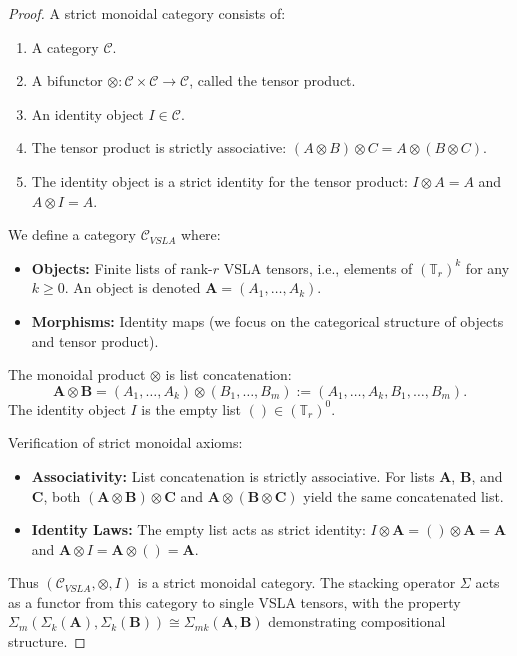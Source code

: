 \documentclass[11pt]{article}
\begin{document}
\begin{proof}
A strict monoidal category consists of:
\begin{enumerate}
    \item A category $\mathcal{C}$.
    \item A bifunctor $\otimes: \mathcal{C} \times \mathcal{C} \to \mathcal{C}$, called the tensor product.
    \item An identity object $I \in \mathcal{C}$.
    \item The tensor product is strictly associative: $(A \otimes B) \otimes C = A \otimes (B \otimes C)$.
    \item The identity object is a strict identity for the tensor product: $I \otimes A = A$ and $A \otimes I = A$.
\end{enumerate}

We define a category $\mathcal{C}_{VSLA}$ where:
\begin{itemize}
    \item \textbf{Objects:} Finite lists of rank-$r$ VSLA tensors, i.e., elements of $(\mathbb{T}_r)^k$ for any $k \ge 0$. An object is denoted $\mathbf{A} = (A_1, \dots, A_k)$.
    \item \textbf{Morphisms:} Identity maps (we focus on the categorical structure of objects and tensor product).
\end{itemize}

The monoidal product $\otimes$ is list concatenation:
\[
    \mathbf{A} \otimes \mathbf{B} = (A_1, \dots, A_k) \otimes (B_1, \dots, B_m) := (A_1, \dots, A_k, B_1, \dots, B_m).
\]
The identity object $I$ is the empty list $() \in (\mathbb{T}_r)^0$.

Verification of strict monoidal axioms:
\begin{itemize}
    \item \textbf{Associativity:} List concatenation is strictly associative. For lists $\mathbf{A}$, $\mathbf{B}$, and $\mathbf{C}$, both $(\mathbf{A} \otimes \mathbf{B}) \otimes \mathbf{C}$ and $\mathbf{A} \otimes (\mathbf{B} \otimes \mathbf{C})$ yield the same concatenated list.
    \item \textbf{Identity Laws:} The empty list acts as strict identity: $I \otimes \mathbf{A} = () \otimes \mathbf{A} = \mathbf{A}$ and $\mathbf{A} \otimes I = \mathbf{A} \otimes () = \mathbf{A}$.
\end{itemize}

Thus $(\mathcal{C}_{VSLA}, \otimes, I)$ is a strict monoidal category. The stacking operator $\Sigma$ acts as a functor from this category to single VSLA tensors, with the property $\Sigma_m(\Sigma_k(\mathbf{A}), \Sigma_k(\mathbf{B})) \cong \Sigma_{mk}(\mathbf{A}, \mathbf{B})$ demonstrating compositional structure.
\end{proof}
\end{document}
